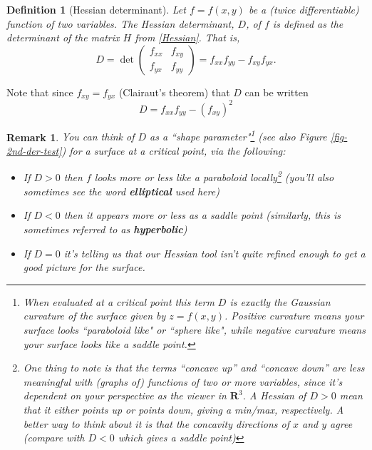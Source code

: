 \documentclass[12pt]{article}
\numberwithin{equation}{subsection}
\numberwithin{figure}{subsection}
\newtheorem{defn}[subsection]{Definition}
\theoremstyle{note}
\newtheorem{remark}[subsection]{Remark}
\begin{document}
{%

\begin{defn}[Hessian determinant] Let $f=f(x,y)$ be a (twice differentiable) function of two variables. The \textit{Hessian determinant}, $D$, of $f$ is defined as the determinant of the matrix $H$ from \eqref{Hessian}. That is, \[ D=\det \begin{pmatrix} f_{xx} & f_{xy} \\ f_{yx} & f_{yy} \end{pmatrix} = f_{xx}f_{yy}-f_{xy}f_{yx}.\]
\end{defn}

Note that since $f_{xy}=f_{yx}$ (Clairaut's theorem) that $D$ can be written \begin{equation} \label{Hess-det} D=f_{xx}f_{yy}-(f_{xy})^2\end{equation} 

\begin{remark}You can think of $D$ as a ``shape parameter"\footnote{When evaluated at a critical point this term $D$ is exactly the \textit{Gaussian curvature} of the surface given by $z=f(x,y)$. Positive curvature means your surface looks ``paraboloid like" or ``sphere like", while negative curvature means your surface looks like a saddle point.}  (see also Figure \ref{fig-2nd-der-test}) for a surface at a critical point, via the following: 
\begin{itemize} 
\item If $D>0$ then $f$ looks more or less like a paraboloid locally\footnote{One thing to note is that the terms ``concave up'' and ``concave down'' are less meaningful with (graphs of) functions of two or more variables, since it's dependent on your perspective as the viewer in $\mathbf{R}^3$. A Hessian of $D>0$  mean that it either points up or points down, giving a min/max, respectively. A better way to think about it is that the concavity directions of $x$ and $y$ agree (compare with $D<0$ which gives a saddle point)} (you'll also sometimes see the word \textbf{elliptical} used here)
\item If $D<0$ then it appears more or less as a saddle point (similarly, this is sometimes referred to as \textbf{hyperbolic})
\item If $D=0$ it's telling us that our Hessian tool isn't quite refined enough to get a good picture for the surface.
\end{itemize}\end{remark}

}
\end{document}
